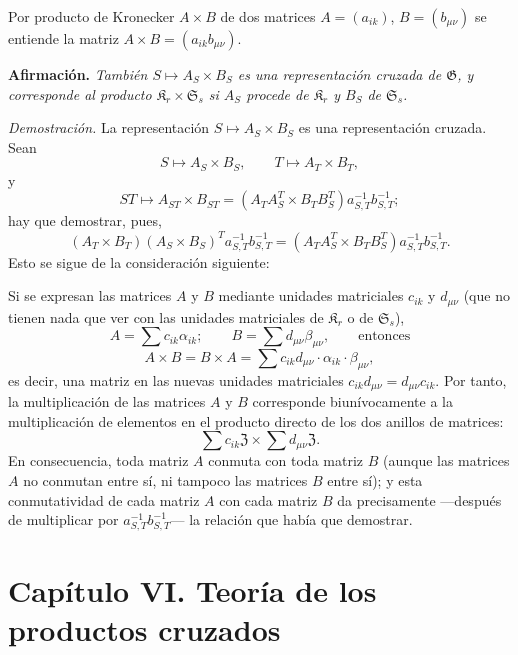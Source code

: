 Por producto de Kronecker \(A\times B\) de dos matrices \(A=(a_{ik})\), \(B=(b_{\mu\nu})\) se entiende la matriz \(A\times B=(a_{ik}b_{\mu\nu})\).

\noindent\textbf{Afirmación.} \emph{También \(S\mapsto A_S\times B_S\) es una representación cruzada de \(\mathfrak G\), y corresponde al producto \(\mathfrak K_r\times\mathfrak S_s\) si \(A_S\) procede de \(\mathfrak K_r\) y \(B_S\) de \(\mathfrak S_s\).}

\noindent\emph{Demostración.} La representación \(S\mapsto A_S\times B_S\) es una representación cruzada. Sean
\[
S\mapsto A_S\times B_S,\qquad T\mapsto A_T\times B_T,
\]
y
\[
ST\mapsto A_{ST}\times B_{ST}
=(A_TA_S^T\times B_TB_S^T)a_{S,T}^{-1}b_{S,T}^{-1};
\]
hay que demostrar, pues,
\[
(A_T\times B_T)(A_S\times B_S)^T a_{S,T}^{-1}b_{S,T}^{-1}
=(A_TA_S^T\times B_TB_S^T)a_{S,T}^{-1}b_{S,T}^{-1}.
\]
Esto se sigue de la consideración siguiente:

Si se expresan las matrices \(A\) y \(B\) mediante unidades matriciales \(c_{ik}\) y \(d_{\mu\nu}\) (que no tienen nada que ver con las unidades matriciales de \(\mathfrak K_r\) o de \(\mathfrak S_s\)),
\[
A=\sum c_{ik}\alpha_{ik};\qquad
B=\sum d_{\mu\nu}\beta_{\mu\nu},\qquad\text{entonces}
\]
\[
A\times B=B\times A
=\sum c_{ik}d_{\mu\nu}\cdot\alpha_{ik}\cdot\beta_{\mu\nu},
\]
es decir, una matriz en las nuevas unidades matriciales \(c_{ik}d_{\mu\nu}=d_{\mu\nu}c_{ik}\). Por tanto, la multiplicación de las matrices \(A\) y \(B\) corresponde biunívocamente a la multiplicación de elementos en el producto directo de los dos anillos de matrices:
\[
\sum c_{ik}\mathfrak Z\times\sum d_{\mu\nu}\mathfrak Z.
\]
En consecuencia, toda matriz \(A\) conmuta con toda matriz \(B\) (aunque las matrices \(A\) no conmutan entre sí, ni tampoco las matrices \(B\) entre sí); y esta conmutatividad de cada matriz \(A\) con cada matriz \(B\) da precisamente ---después de multiplicar por \(a_{S,T}^{-1}b_{S,T}^{-1}\)--- la relación que había que demostrar.

\section*{Capítulo VI. Teoría de los productos cruzados}\label{kapitel-vi.-theorie-der-verschraenkten-produkte}

